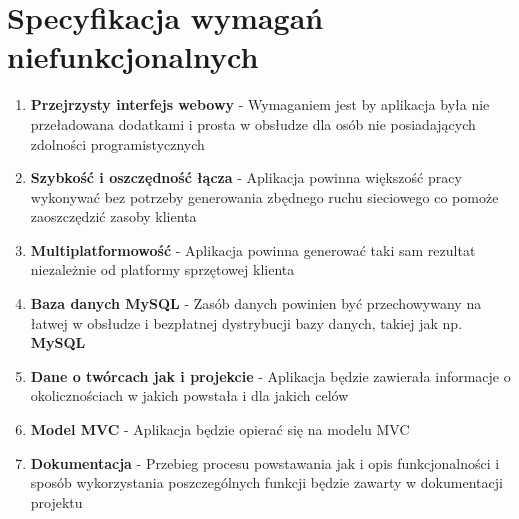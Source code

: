 \section{Specyfikacja wymagań niefunkcjonalnych}

\begin{enumerate}
  \item \textbf{Przejrzysty interfejs webowy} - Wymaganiem jest by aplikacja była nie przeładowana dodatkami i prosta w obsłudze dla osób nie posiadających zdolności programistycznych

  \item \textbf{Szybkość i oszczędność łącza} - Aplikacja powinna większość pracy wykonywać bez potrzeby generowania zbędnego ruchu sieciowego co pomoże zaoszczędzić zasoby klienta

  \item \textbf{Multiplatformowość} - Aplikacja powinna generować taki sam rezultat niezależnie od platformy sprzętowej klienta

  \item \textbf{Baza danych MySQL} - Zasób danych powinien być przechowywany na łatwej w obsłudze i bezpłatnej dystrybucji bazy danych, takiej jak np. \textbf{MySQL}
  
  \item \textbf{Dane o twórcach jak i projekcie} - Aplikacja będzie zawierała informacje o okolicznościach w jakich powstała i dla jakich celów
  
  \item \textbf{Model MVC} - Aplikacja będzie opierać się na modelu MVC
  
  \item \textbf{Dokumentacja} - Przebieg procesu powstawania jak i opis funkcjonalności i sposób wykorzystania poszczególnych funkcji będzie zawarty w dokumentacji projektu
\end{enumerate}
